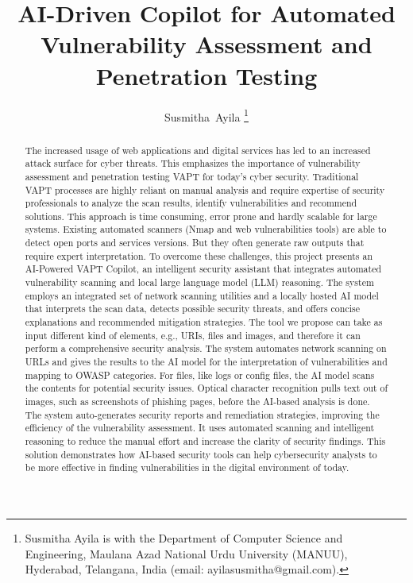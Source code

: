 \documentclass[journal]{IEEEtran}
\begin{document}
\title{AI-Driven Copilot for Automated Vulnerability Assessment and Penetration Testing}

\author{Susmitha~Ayila%
\thanks{Susmitha Ayila is with the Department of Computer Science and Engineering, Maulana Azad National Urdu University (MANUU), Hyderabad, Telangana, India (email: ayilasusmitha@gmail.com).}}

\maketitle


\begin{abstract}
The increased usage of web applications and digital services has led to an increased attack surface for cyber threats. This emphasizes the importance of vulnerability assessment and penetration testing VAPT for today’s cyber security. Traditional VAPT processes are highly reliant on manual analysis and require expertise of security professionals to analyze the scan results, identify vulnerabilities and recommend solutions. This approach is time consuming, error prone and hardly scalable for large systems. Existing automated scanners (Nmap and web vulnerabilities tools) are able to detect open ports and services versions. But they often generate raw outputs that require expert interpretation. To overcome these challenges, this project presents an AI-Powered VAPT Copilot, an intelligent security assistant that integrates automated vulnerability scanning and local large language model (LLM) reasoning. The system employs an integrated set of network scanning utilities and a locally hosted AI model that interprets the scan data, detects possible security threats, and offers concise explanations and recommended mitigation strategies. The tool we propose can take as input different kind of elements, e.g., URIs, files and images, and therefore it can perform a comprehensive security analysis. The system automates network scanning on URLs and gives the results to the AI model for the interpretation of vulnerabilities and mapping to OWASP categories. For files, like logs or config files, the AI model scans the contents for potential security issues. Optical character recognition pulls text out of images, such as screenshots of phishing pages, before the AI-based analysis is done. The system auto-generates security reports and remediation strategies, improving the efficiency of the vulnerability assessment. It uses automated scanning and intelligent reasoning to reduce the manual effort and increase the clarity of security findings. This solution demonstrates how AI-based security tools can help cybersecurity analysts to be more effective in finding vulnerabilities in the digital environment of today.
\end{abstract}
\end{document}

